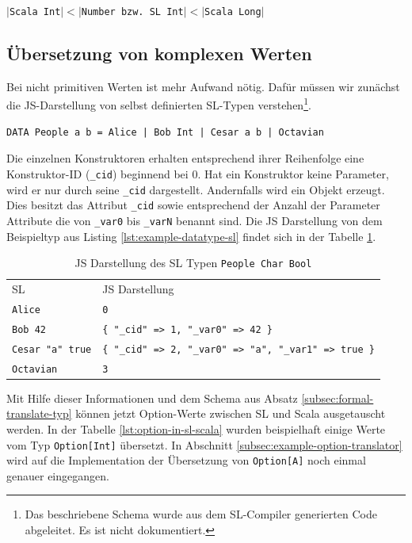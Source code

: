 \documentclass[12pt,bibtotoc]{scrreprt}
\begin{document}
\begin{center}
$|$\lstinline!Scala Int!$| < |$\lstinline!Number bzw. SL Int!$| < |$\lstinline!Scala Long!$|$
\end{center}

\subsection{Übersetzung von komplexen Werten}

Bei nicht primitiven Werten ist mehr Aufwand nötig. Dafür müssen wir zunächst die JS-Darstellung von selbst definierten SL-Typen verstehen\footnote{Das beschriebene Schema wurde aus dem SL-Compiler generierten Code abgeleitet. Es ist nicht dokumentiert.}.

\begin{lstlisting}[caption=Beispiel eines selbst definierten Typs, label=lst:example-datatype-sl]
DATA People a b = Alice | Bob Int | Cesar a b | Octavian
\end{lstlisting}

Die einzelnen Konstruktoren erhalten entsprechend ihrer Reihenfolge eine Konstruktor-ID (\lstinline!_cid!) beginnend bei $0$. Hat ein Konstruktor keine Parameter, wird er nur durch seine \lstinline!_cid! dargestellt. Andernfalls wird ein Objekt erzeugt. Dies besitzt das Attribut \lstinline!_cid! sowie entsprechend der Anzahl der Parameter Attribute die von \lstinline!_var0! bis \lstinline!_varN! benannt sind. Die JS Darstellung von dem Beispieltyp aus Listing \ref{lst:example-datatype-sl} findet sich in der Tabelle \ref{tab:js-code-of-people}.

\begin{table}[h]
\caption{JS Darstellung des \ac{SL} Typen \lstinline!People Char Bool!}
\centering
\begin{tabular}{ll}
 \ac{SL}              &  \ac{JS} Darstellung \\
\lstinline!Alice!           &  \lstinline!0! \\
\lstinline!Bob 42!          &  \lstinline!{ "_cid" => 1, "_var0" => 42 }! \\
\lstinline!Cesar "a" true!  &  \lstinline!{ "_cid" => 2, "_var0" => "a", "_var1" => true }! \\
\lstinline!Octavian!        &  \lstinline!3! \\
\end{tabular}
\label{tab:js-code-of-people}
\end{table}

Mit Hilfe dieser Informationen und dem Schema aus Absatz \ref{subsec:formal-translate-typ} können jetzt Option-Werte zwischen SL und Scala ausgetauscht werden. In der Tabelle \ref{lst:option-in-sl-scala} wurden beispielhaft einige Werte vom Typ \lstinline!Option[Int]! übersetzt. In Abschnitt \ref{subsec:example-option-translator} wird auf die Implementation der Übersetzung von \lstinline!Option[A]! noch einmal genauer eingegangen.
\end{document}
